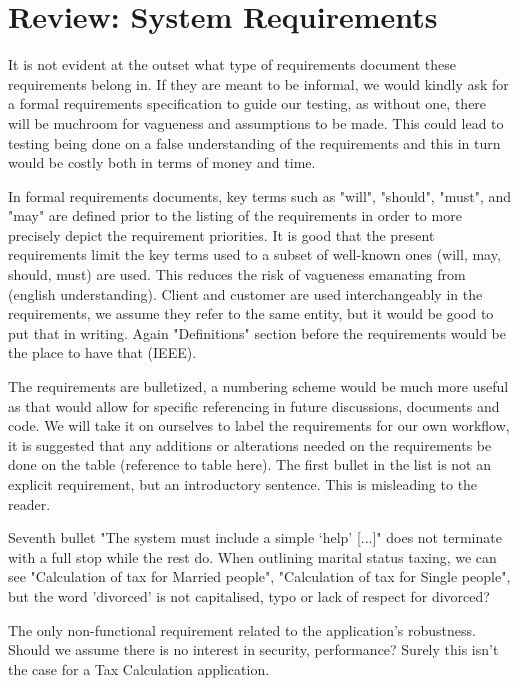 \section{Review: System Requirements}

It is not evident at the outset what type of requirements document these requirements belong in. If they are meant to be informal, we would kindly ask for a formal requirements specification to guide our testing, as without one, there will be muchroom for vagueness and assumptions to be made. This could lead to testing being done on a false understanding of the requirements and this in turn would be costly both in terms of money and time.  

In formal requirements documents, key terms such as "will", "should", "must", and "may" are defined prior to the listing of the requirements in order to more precisely depict the requirement priorities.
It is good that the present requirements limit the key terms used to a subset of well-known ones (will, may, should, must) are used. This reduces the risk of vagueness emanating from (english understanding). 
Client and customer are used interchangeably in the requirements, we assume they refer to the same entity, but it would be good to put that in writing. Again "Definitions" section before the requirements would be the place to have that (IEEE).

The requirements are bulletized, a numbering scheme would be much more useful as that would allow for specific referencing in future discussions, documents and code. 
We will take it on ourselves to label the requirements for our own workflow, it is suggested that any additions or alterations needed on the requirements be done on the table (reference to table here). 
The first bullet in the list is not an explicit requirement, but an introductory sentence. This is misleading to the reader. 

Seventh bullet "The system must include a simple ‘help’ [...]" does not terminate with a full stop while the rest do. 
When outlining marital status taxing, we can see "Calculation of tax for Married people", "Calculation of tax for Single people", but the word 'divorced' is not capitalised, typo or lack of respect for divorced?  

The only non-functional requirement related to the application's robustness. Should we assume there is no interest in security, performance? Surely this isn't the case for a Tax Calculation application. 

